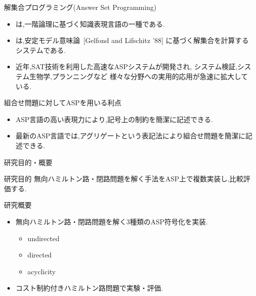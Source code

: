 \documentclass[dvipdfmx,11pt]{beamer}
\begin{document}
\begin{frame}{解集合プログラミング(Answer Set Programming)}
  \begin{itemize}
  \item {}は,一階論理に基づく知識表現言語の一種である.
  \item {}は,安定モデル意味論~[Gelfond and Lifschitz '88]
    に基づく解集合を計算するシステムである.
  \item 近年,SAT技術を利用した高速なASPシステムが開発され,
    システム検証,システム生物学,プランニングなど
    様々な分野への実用的応用が急速に拡大している.
  \end{itemize}
  \begin{alertblock}{組合せ問題に対してASPを用いる利点}
    \begin{itemize}
    \item ASP言語の高い表現力により,記号上の制約を簡潔に記述できる.
    \item 最新のASP言語では,アグリゲートという表記法により組合せ問題を簡潔に記述できる.
    \end{itemize}
  \end{alertblock}
\end{frame}
\begin{frame}{研究目的・概要}
  \begin{alertblock}{研究目的}
    無向ハミルトン路・閉路問題を解く手法をASP上で複数実装し,比較評価する.
  \end{alertblock}
  \begin{block}{研究概要}
    \begin{itemize}
    \item 無向ハミルトン路・閉路問題を解く3種類のASP符号化を実装.
      \begin{itemize}
      \item undirected
      \item directed
      \item acyclicity
      \end{itemize}
    \item コスト制約付きハミルトン路問題で実験・評価.
    \end{itemize}
  \end{block}
\end{frame}
\end{document}
